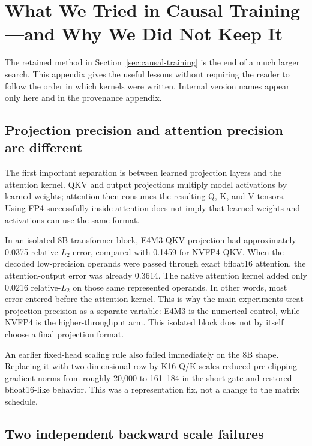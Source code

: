 \section{What We Tried in Causal Training---and Why We Did Not Keep It}
\label{app:causal-design-history}

The retained method in Section~\ref{sec:causal-training} is the end of a much
larger search.  This appendix gives the useful lessons without requiring the
reader to follow the order in which kernels were written.  Internal version
names appear only here and in the provenance appendix.

\subsection{Projection precision and attention precision are different}

The first important separation is between learned projection layers and the
attention kernel.  QKV and output projections multiply model activations by
learned weights; attention then consumes the resulting Q, K, and V tensors.
Using FP4 successfully inside attention does not imply that learned weights
and activations can use the same format.

In an isolated 8B transformer block, E4M3 QKV projection had approximately
0.0375 relative-$L_2$ error, compared with 0.1459 for NVFP4 QKV.  When the
decoded low-precision operands were passed through exact bfloat16 attention,
the attention-output error was already 0.3614.  The native attention kernel added only
0.0216 relative-$L_2$ on those same represented operands.  In other words,
most error entered before the attention kernel.  This is why the main
experiments treat projection precision as a separate variable: E4M3 is the
numerical control, while NVFP4 is the higher-throughput arm.  This isolated
block does not by itself choose a final projection format.

An earlier fixed-head scaling rule also failed immediately on the 8B shape.
Replacing it with two-dimensional row-by-K16 Q/K scales reduced pre-clipping
gradient norms from roughly 20,000 to 161--184 in the short gate and restored
bfloat16-like behavior.  This was a representation fix, not a change to the
matrix schedule.

\subsection{Two independent backward scale failures}

